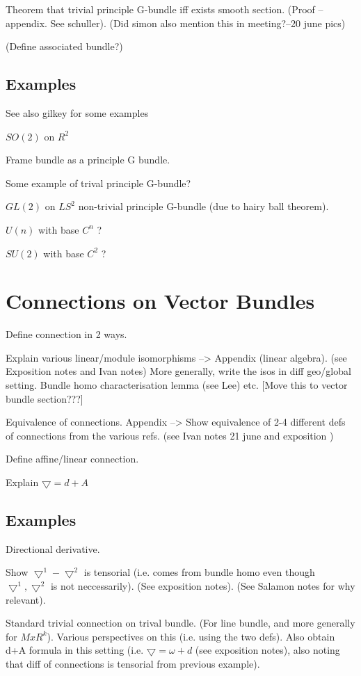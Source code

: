 \documentclass[a4paper]{article}
\theoremstyle{definition} \newtheorem*{definition}{Definition}
\theoremstyle{definition} \newtheorem*{definitions}{Definitions}
\theoremstyle{plain} \newtheorem{theorem}{Theorem}[section]
\theoremstyle{plain} \newtheorem{proposition}[theorem]{Proposition}
\theoremstyle{plain} \newtheorem{corollary}[theorem]{Corollary}
\theoremstyle{plain} \newtheorem{lemma}[theorem]{Lemma}
\theoremstyle{plain} \newtheorem{example}[theorem]{Example}
\begin{document}
Theorem that trivial principle G-bundle iff exists smooth section. (Proof -- appendix. See schuller).  (Did simon also mention this in meeting?--20 june pics)

(Define associated bundle?)

\subsection{Examples}
See also gilkey for some examples

$SO(2)$ on $R^2$

Frame bundle as a principle G bundle.

Some example of trival principle G-bundle?

$GL(2)$ on $LS^2$ non-trivial principle G-bundle (due to hairy ball theorem).

$U(n)$ with base $C^n$ ?

$SU(2)$ with base $C^2$ ? 

\section{Connections on Vector Bundles}

Define connection in 2 ways.

Explain various linear/module isomorphisms --> Appendix (linear algebra). (see Exposition notes and Ivan notes)
More generally, write the isos in diff geo/global setting. Bundle homo characterisation lemma (see Lee) etc. [Move this to vector bundle section???] 

Equivalence of connections. 
Appendix --> Show equivalence of 2-4 different defs of connections from the various refs.  (see Ivan notes 21 june and exposition )

Define affine/linear connection.

Explain $\bigtriangledown = d +A$

\subsection{Examples}

Directional derivative.

Show $\bigtriangledown^1 - \bigtriangledown^2$ is tensorial (i.e. comes from bundle homo even though $\bigtriangledown^1,  \bigtriangledown^2$ is not neccessarily). (See exposition notes). (See Salamon notes for why relevant).

Standard trivial connection on trival bundle. (For line bundle, and more generally for $MxR^k$). Various perspectives on this (i.e. using the two defs). Also obtain d+A formula in this setting (i.e. $\bigtriangledown = \omega + d$ (see exposition notes), also noting that diff of connections is tensorial from previous example).
\end{document}
